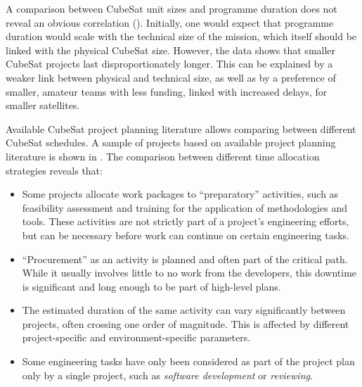 \documentclass[a4paper,nobib,justified,final]{tufte-book}
\begin{document}
A comparison between CubeSat unit sizes and programme duration does not reveal an obvious correlation (). Initially, one would expect that programme duration would scale with the technical size of the mission, which itself should be linked with the physical CubeSat size. However, the data shows that smaller CubeSat projects last disproportionately longer. This can be explained by a weaker link between physical and technical size, as well as by a preference of smaller, amateur teams with less funding, linked with increased delays, for smaller satellites.

Available CubeSat project planning literature allows comparing between different CubeSat schedules. A sample of projects based on available project planning literature is shown in . The comparison between different time allocation strategies reveals that:
\begin{itemize}
	\item Some projects allocate work packages to ``preparatory'' activities, such as feasibility assessment and training for the application of methodologies and tools. These activities are not strictly part of a project's engineering efforts, but can be necessary before work can continue on certain engineering tasks.
	\item ``Procurement'' as an activity is planned and often part of the critical path. While it usually involves little to no work from the developers, this downtime is significant and long enough to be part of high-level plans.
	\item The estimated duration of the same activity can vary significantly between projects, often crossing one order of magnitude. This is affected by different project-specific and environment-specific parameters.
	\item Some engineering tasks have only been considered as part of the project plan only by a single project, such as \emph{software development} or \emph{reviewing}.
\end{itemize}
\end{document}
